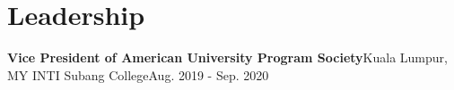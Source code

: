 \section{Leadership}

    \resumeSubHeadingListStart
      \resumeSubheading
          {\textbf{Vice President of American University Program Society}}{Kuala Lumpur, MY}
          {INTI Subang College}{Aug. 2019 - Sep. 2020}
        \resumeItemListStart
        \resumeItemListEnd
    \resumeSubHeadingListEnd